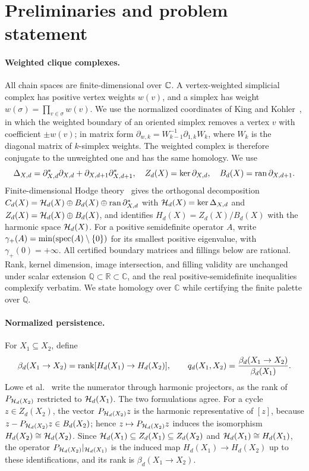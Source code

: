 \section{Preliminaries and problem statement}
\label{sec:prelim}

\paragraph{Weighted clique complexes.}
All chain spaces are finite-dimensional over \(\mathbb{C}\).  A vertex-weighted
simplicial complex has positive vertex weights \(w(v)\), and a simplex has
weight \(w(\sigma)=\prod_{v\in\sigma}w(v)\).  We use the normalized
coordinates of King and Kohler~\cite{king2026gapped}, in which the weighted
boundary of an oriented simplex removes a vertex \(v\) with coefficient
\(\pm w(v)\); in matrix form \(\partial_{w,k}=W_{k-1}^{-1}\partial_{1,k}W_k\),
where \(W_k\) is the diagonal matrix of \(k\)-simplex weights.  The weighted
complex is therefore conjugate to the unweighted one and has the same
homology.  We use
\[
\Delta_{X,d}=\partial_{X,d}^*\partial_{X,d}
+\partial_{X,d+1}\partial_{X,d+1}^*,\quad
Z_d(X)=\ker\partial_{X,d},\quad
B_d(X)=\operatorname{ran}\partial_{X,d+1}.
\]
Finite-dimensional Hodge theory~\cite{eckmann1944harmonische,horak2013spectra}
gives the orthogonal decomposition
\(C_d(X)=\mathcal{H}_d(X)\oplus B_d(X)\oplus\operatorname{ran}\partial_{X,d}^*\) with
\(\mathcal{H}_d(X)=\ker\Delta_{X,d}\) and \(Z_d(X)=\mathcal{H}_d(X)\oplus B_d(X)\), and
identifies \(H_d(X)=Z_d(X)/B_d(X)\) with the harmonic space \(\mathcal{H}_d(X)\).
For a positive semidefinite operator \(A\), write
\(\gamma_+(A)=\min(\operatorname{spec}(A)\setminus\{0\})\) for its smallest positive
eigenvalue, with \(\gamma_+(0)=+\infty\).
All certified boundary matrices and fillings below are rational.  Rank, kernel
dimension, image intersection, and filling validity are unchanged under scalar
extension \(\mathbb Q\subset\mathbb R\subset\mathbb C\), and the real
positive-semidefinite inequalities complexify verbatim.  We state homology
over \(\mathbb C\) while certifying the finite palette over \(\mathbb Q\).

\paragraph{Normalized persistence.}
For \(X_1\subseteq X_2\), define
\begin{equation}
\label{eq:true-ratio}
\beta_d(X_1\to X_2)
=\operatorname{rank}[H_d(X_1)\to H_d(X_2)],\qquad
q_d(X_1,X_2)
=\frac{\beta_d(X_1\to X_2)}{\beta_d(X_1)}.
\end{equation}
Lowe et al.~\cite{lowe2026normalized} write the numerator through harmonic
projectors, as the rank of \(P_{\mathcal{H}_d(X_2)}\) restricted to \(\mathcal{H}_d(X_1)\).
The two formulations agree.  For a cycle \(z\in Z_d(X_2)\), the vector
\(P_{\mathcal{H}_d(X_2)}z\) is the harmonic representative of \([z]\), because
\(z-P_{\mathcal{H}_d(X_2)}z\in B_d(X_2)\); hence \(z\mapsto P_{\mathcal{H}_d(X_2)}z\) induces
the isomorphism \(H_d(X_2)\cong\mathcal{H}_d(X_2)\).  Since
\(\mathcal{H}_d(X_1)\subseteq Z_d(X_1)\subseteq Z_d(X_2)\) and
\(\mathcal{H}_d(X_1)\cong H_d(X_1)\), the operator \(P_{\mathcal{H}_d(X_2)}|_{\mathcal{H}_d(X_1)}\) is
the induced map \(H_d(X_1)\to H_d(X_2)\) up to these identifications, and its
rank is \(\beta_d(X_1\to X_2)\).

